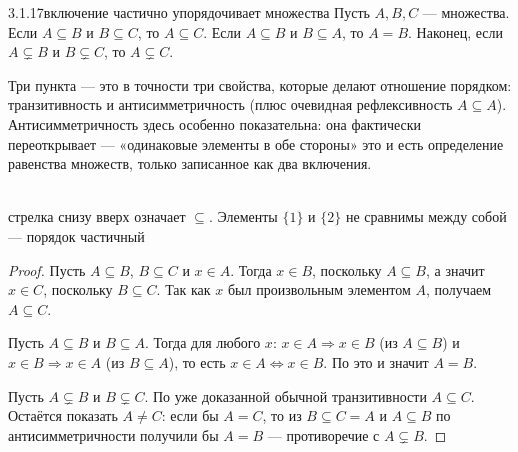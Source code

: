 \begin{proposition}{3.1.17}{включение частично упорядочивает множества}
Пусть $A,B,C$ — множества. Если $A \subseteq B$ и $B \subseteq C$, то $A \subseteq C$. Если
$A \subseteq B$ и $B \subseteq A$, то $A=B$. Наконец, если $A \subsetneq B$ и
$B \subsetneq C$, то $A \subsetneq C$.
\end{proposition}

\begin{intuition}
Три пункта — это в точности три свойства, которые делают отношение порядком: транзитивность
и антисимметричность (плюс очевидная рефлексивность $A \subseteq A$). Антисимметричность
здесь особенно показательна: она фактически переоткрывает  —
«одинаковые элементы в обе стороны» это и есть определение равенства множеств, только
записанное как два включения.

\begin{center}
\\
{\footnotesize\color{intuitiongray}стрелка снизу вверх означает $\subseteq$. Элементы
$\{1\}$ и $\{2\}$ не сравнимы между собой — порядок частичный}
\end{center}
\end{intuition}

\begin{proof}
 Пусть $A \subseteq B$, $B \subseteq C$ и $x \in A$. Тогда
$x \in B$, поскольку $A \subseteq B$, а значит $x \in C$, поскольку $B \subseteq C$. Так
как $x$ был произвольным элементом $A$, получаем $A \subseteq C$.

 Пусть $A \subseteq B$ и $B \subseteq A$. Тогда для любого
$x$: $x \in A \Rightarrow x \in B$ (из $A \subseteq B$) и $x \in B \Rightarrow x \in A$ (из
$B \subseteq A$), то есть $x \in A \iff x \in B$. По  это и
значит $A=B$.

 Пусть $A \subsetneq B$ и $B \subsetneq C$. По уже
доказанной обычной транзитивности $A \subseteq C$. Остаётся показать $A \neq C$: если бы
$A=C$, то из $B \subseteq C = A$ и $A \subseteq B$ по антисимметричности получили бы
$A=B$ — противоречие с $A \subsetneq B$.
\end{proof}

